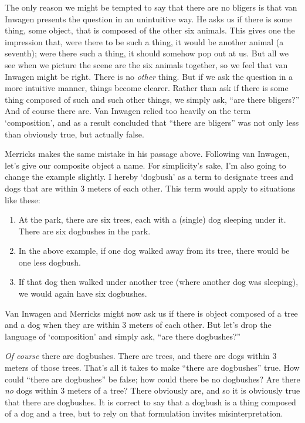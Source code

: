 \documentclass[11pt]{article}
\begin{document}
\begin{spacing}{1.25}
The only reason we might be tempted to say that there are no bligers
is that van Inwagen presents the question in an unintuitive way.  He
asks us if there is some thing, some object, that is composed of the
other six animals.  This gives one the impression that, were there to
be such a thing, it would be another animal (a seventh); were there
such a thing, it should somehow pop out at us.  But all we see when we
picture the scene are the six animals together, so we feel that van
Inwagen might be right.  There is no {\em other} thing.  But if we ask
the question in a more intuitive manner, things become clearer.
Rather than ask if there is some thing composed of such and such other
things, we simply ask, ``are there bligers?''  And of course there
are.  Van Inwagen relied too heavily on the term `composition', and as
a result concluded that ``there are bligers'' was not only less than
obviously true, but actually false.

Merricks makes the same mistake in his passage above.  Following van
Inwagen, let's give our composite object a name.  For simplicity's
sake, I'm also going to change the example slightly.  I hereby
`dogbush' as a term to designate trees and dogs that are within 3
meters of each other.  This term would apply to situations like these:

\begin{enumerate}
  \item At the park, there are six trees, each with a (single) dog
    sleeping under it.  There are six dogbushes in the park.
  \item In the above example, if one dog walked away from its tree,
    there would be one less dogbush.
  \item If that dog then walked under another tree (where another dog
    was sleeping), we would again have six dogbushes.
\end{enumerate}

Van Inwagen and Merricks might now ask us if there is object composed
of a tree and a dog when they are within 3 meters of each other.  But
let's drop the language of `composition' and simply ask, ``are there
dogbushes?''

{\em Of course} there are dogbushes.  There are trees, and there are
dogs within 3 meters of those trees.  That's all it takes to make
``there are dogbushes'' true.  How could ``there are dogbushes'' be
false; how could there be no dogbushes?  Are there {\em no} dogs
within 3 meters of a tree?  There obviously are, and so it is
obviously true that there are dogbushes.  It is correct to say that a
dogbush is a thing composed of a dog and a tree, but to rely on that
formulation invites misinterpretation.


\end{spacing}
\end{document}
